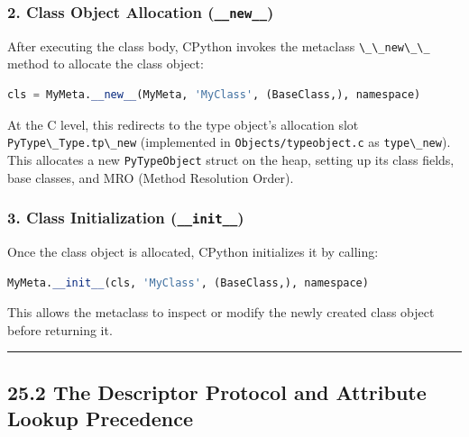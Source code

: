 \hypertarget{class-object-allocation-__new__}{%
\subsubsection{\texorpdfstring{2. Class Object Allocation
(\texttt{\_\_new\_\_})}{2. Class Object Allocation (\_\_new\_\_)}}\label{class-object-allocation-__new__}}

After executing the class body, CPython invokes the metaclass
\passthrough{\lstinline!\_\_new\_\_!} method to allocate the class
object:

\begin{lstlisting}[language=Python]
cls = MyMeta.__new__(MyMeta, 'MyClass', (BaseClass,), namespace)
\end{lstlisting}

At the C level, this redirects to the type object's allocation slot
\passthrough{\lstinline!PyType\_Type.tp\_new!} (implemented in
\passthrough{\lstinline!Objects/typeobject.c!} as
\passthrough{\lstinline!type\_new!}). This allocates a new
\passthrough{\lstinline!PyTypeObject!} struct on the heap, setting up
its class fields, base classes, and MRO (Method Resolution Order).

\hypertarget{class-initialization-__init__}{%
\subsubsection{\texorpdfstring{3. Class Initialization
(\texttt{\_\_init\_\_})}{3. Class Initialization (\_\_init\_\_)}}\label{class-initialization-__init__}}

Once the class object is allocated, CPython initializes it by calling:

\begin{lstlisting}[language=Python]
MyMeta.__init__(cls, 'MyClass', (BaseClass,), namespace)
\end{lstlisting}

This allows the metaclass to inspect or modify the newly created class
object before returning it.

\begin{center}\rule{0.5\linewidth}{0.5pt}\end{center}

\hypertarget{the-descriptor-protocol-and-attribute-lookup-precedence}{%
\subsection{25.2 The Descriptor Protocol and Attribute Lookup
Precedence}\label{the-descriptor-protocol-and-attribute-lookup-precedence}}

